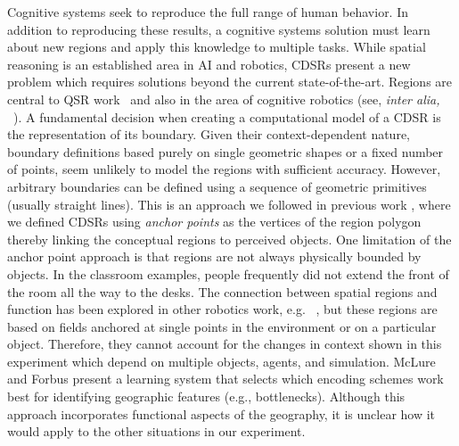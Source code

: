 \documentclass[11pt,letterpaper]{article}
\begin{document}
Cognitive systems seek to reproduce the full range of human behavior.  In addition to reproducing these results, a cognitive systems solution must learn about new regions and apply this knowledge to multiple tasks.  While spatial reasoning is an established area in AI and robotics, CDSRs present a new problem which requires solutions beyond the current state-of-the-art. Regions are central to QSR work~\cite{Cohn:2001} and also in the area of cognitive robotics (see, \emph{inter alia,} ~\cite{brenneretal07ijcai,kelleher/costello:09}). A fundamental decision when creating a computational model of a CDSR is the representation of its boundary. Given their context-dependent nature, boundary definitions based purely on single geometric shapes or a fixed number of points, seem unlikely to model the regions with sufficient accuracy. However, arbitrary boundaries can be defined using a sequence of geometric primitives (usually straight lines). This is an approach we followed in previous work \cite{Hawes:2012}, where we defined CDSRs using \textit{anchor points} as the vertices of the region polygon thereby linking the conceptual regions to perceived objects. One limitation of the anchor point approach is that regions are not always physically bounded by objects.  In the classroom examples, people frequently did not extend the front of the room all the way to the desks. The connection between spatial regions and function has been explored in other robotics work, e.g. ~\cite{Karg:2012,Fasola:2013}, but these regions are based on fields anchored at single points in the environment or on a particular object. Therefore, they cannot account for the changes in context shown in this experiment which depend on multiple objects, agents, and simulation.  McLure and Forbus \cite{McLureForbus:2012} present a learning system that selects which encoding schemes work best for identifying geographic features (e.g., bottlenecks).  Although this approach incorporates functional aspects of the geography, it is unclear how it would apply to the other situations in our experiment.  




\end{document}
